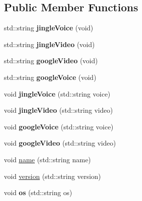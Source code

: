 \subsection*{Public Member Functions}
\begin{DoxyCompactItemize}
\item 
\hypertarget{classSwVersion_a6ae2dbaeee1cd410ca50756c78471ce6}{
std::string {\bfseries jingleVoice} (void)}
\label{classSwVersion_a6ae2dbaeee1cd410ca50756c78471ce6}

\item 
\hypertarget{classSwVersion_af23f457780ec4748c8c479c29b3b4908}{
std::string {\bfseries jingleVideo} (void)}
\label{classSwVersion_af23f457780ec4748c8c479c29b3b4908}

\item 
\hypertarget{classSwVersion_a09ede9767049fcdd7406438f12bc6d09}{
std::string {\bfseries googleVideo} (void)}
\label{classSwVersion_a09ede9767049fcdd7406438f12bc6d09}

\item 
\hypertarget{classSwVersion_a4ffc1c6eb5c6067dabd3f7e6b08425d9}{
std::string {\bfseries googleVoice} (void)}
\label{classSwVersion_a4ffc1c6eb5c6067dabd3f7e6b08425d9}

\item 
\hypertarget{classSwVersion_ae88d0cc8d78b9295bc18c8d5721e4cd9}{
void {\bfseries jingleVoice} (std::string voice)}
\label{classSwVersion_ae88d0cc8d78b9295bc18c8d5721e4cd9}

\item 
\hypertarget{classSwVersion_a8600a41575666884dce7932aaa316757}{
void {\bfseries jingleVideo} (std::string video)}
\label{classSwVersion_a8600a41575666884dce7932aaa316757}

\item 
\hypertarget{classSwVersion_a715d41faf1de9334e9e5b3b36b810ce0}{
void {\bfseries googleVoice} (std::string voice)}
\label{classSwVersion_a715d41faf1de9334e9e5b3b36b810ce0}

\item 
\hypertarget{classSwVersion_a2c1c9e3e9c8edff6a0191a8ccb86d00b}{
void {\bfseries googleVideo} (std::string video)}
\label{classSwVersion_a2c1c9e3e9c8edff6a0191a8ccb86d00b}

\item 
void \hyperlink{classSwVersion_a3a830f6fdca767478505d6f9fa9fc0e8}{name} (std::string name)
\item 
void \hyperlink{classSwVersion_ab40b0d69e556dec6befaf28b438521ea}{version} (std::string version)
\item 
\hypertarget{classSwVersion_ad6931ef60dd698938563cabf1c3b73d6}{
void {\bfseries os} (std::string os)}
\label{classSwVersion_ad6931ef60dd698938563cabf1c3b73d6}


\end{DoxyCompactItemize}
